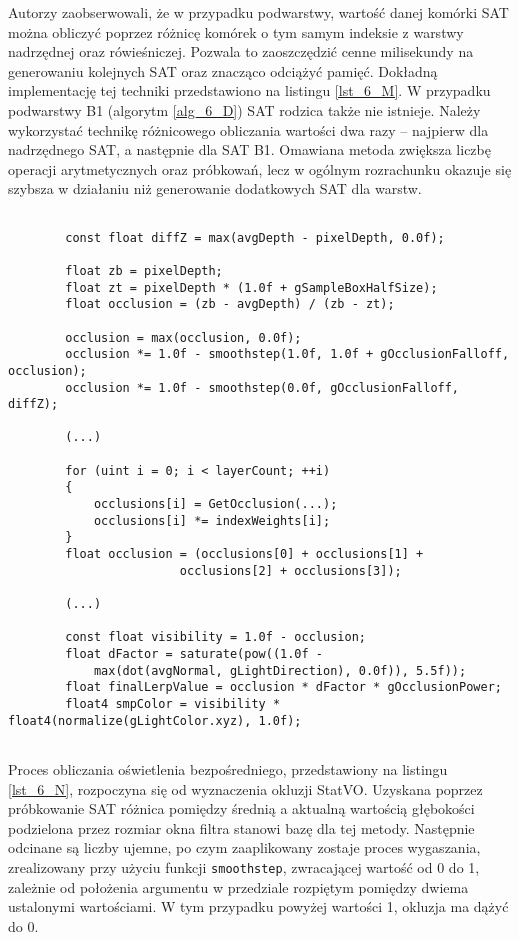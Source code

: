 		Autorzy \cite{statvo} zaobserwowali, że w przypadku podwarstwy, wartość danej komórki SAT można obliczyć poprzez różnicę komórek o tym samym indeksie z warstwy nadrzędnej oraz rówieśniczej. Pozwala to zaoszczędzić cenne milisekundy na generowaniu kolejnych SAT oraz znacząco odciążyć pamięć. Dokładną implementację tej techniki przedstawiono na listingu \ref{lst_6_M}. W przypadku podwarstwy B1 (algorytm \ref{alg_6_D}) SAT rodzica także nie istnieje. Należy wykorzystać technikę różnicowego obliczania wartości dwa razy -- najpierw dla nadrzędnego SAT, a następnie dla SAT B1. Omawiana metoda zwiększa liczbę operacji arytmetycznych oraz próbkowań, lecz w ogólnym rozrachunku okazuje się szybsza w działaniu niż generowanie dodatkowych SAT dla warstw. \pagebreak
		
		\begin{lstlisting}[language=HLSL,caption={Obliczenie oświetlenia bezpośredniego SSDO-B.},label={lst_6_N}]
		
		const float diffZ = max(avgDepth - pixelDepth, 0.0f);
		
		float zb = pixelDepth;
		float zt = pixelDepth * (1.0f + gSampleBoxHalfSize);
		float occlusion = (zb - avgDepth) / (zb - zt);
		
		occlusion = max(occlusion, 0.0f);
		occlusion *= 1.0f - smoothstep(1.0f, 1.0f + gOcclusionFalloff, occlusion);
		occlusion *= 1.0f - smoothstep(0.0f, gOcclusionFalloff, diffZ);
		
		(...)
		
		for (uint i = 0; i < layerCount; ++i)
		{
			occlusions[i] = GetOcclusion(...);
			occlusions[i] *= indexWeights[i];
		}
		float occlusion = (occlusions[0] + occlusions[1] + 
						occlusions[2] + occlusions[3]);
		
		(...)
		
		const float visibility = 1.0f - occlusion;
		float dFactor = saturate(pow((1.0f - 
			max(dot(avgNormal, gLightDirection), 0.0f)), 5.5f));
		float finalLerpValue = occlusion * dFactor * gOcclusionPower;
		float4 smpColor = visibility * float4(normalize(gLightColor.xyz), 1.0f);
		
		\end{lstlisting}
		
		Proces obliczania oświetlenia bezpośredniego, przedstawiony na listingu \ref{lst_6_N}, rozpoczyna się od wyznaczenia okluzji StatVO. Uzyskana poprzez próbkowanie SAT różnica pomiędzy średnią a aktualną wartością głębokości podzielona przez rozmiar okna filtra stanowi bazę dla tej metody. Następnie odcinane są liczby ujemne, po czym zaaplikowany zostaje proces wygaszania, zrealizowany przy użyciu funkcji \texttt{smoothstep}, zwracającej wartość od 0 do 1, zależnie od położenia argumentu w przedziale rozpiętym pomiędzy dwiema ustalonymi wartościami. W tym przypadku powyżej wartości 1, okluzja ma dążyć do 0.
		
